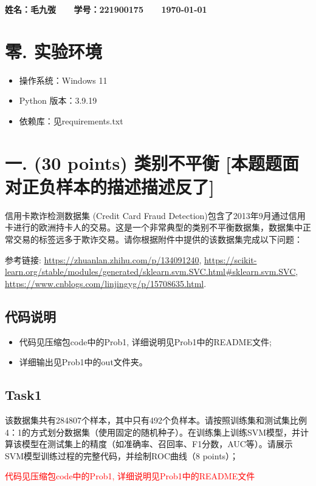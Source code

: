 \documentclass[8pt]{article}
\begin{document}
\textbf{\color{blue} \Large 姓名：毛九弢 \ \ \ 学号：221900175 \ \ \ \today}

\section*{零. 实验环境}
\begin{itemize}
    \item 操作系统：Windows 11
    \item Python 版本：3.9.19
    \item 依赖库：见requirements.txt
\end{itemize}

\section*{一. (30 points) 类别不平衡 [本题题面对正负样本的描述描述反了]}

信用卡欺诈检测数据集 (Credit Card Fraud Detection)包含了2013年9月通过信用卡进行的欧洲持卡人的交易。这是一个非常典型的类别不平衡数据集，数据集中正常交易的标签远多于欺诈交易。请你根据附件中提供的该数据集完成以下问题：

参考链接: 
\url{https://zhuanlan.zhihu.com/p/134091240},
\url{https://scikit-learn.org/stable/modules/generated/sklearn.svm.SVC.html#sklearn.svm.SVC},
\url{https://www.cnblogs.com/linjingyg/p/15708635.html}.

\subsection*{代码说明}
\begin{itemize}
    \item 代码见压缩包code中的Prob1, 详细说明见Prob1中的README文件; 
    \item 详细输出见Prob1中的out文件夹。
\end{itemize}

\subsection*{Task1}
该数据集共有284807个样本，其中只有492个负样本。请按照训练集和测试集比例4：1的方式划分数据集（使用固定的随机种子）。在训练集上训练SVM模型，并计算该模型在测试集上的精度（如准确率、召回率、F1分数，AUC等）。请展示SVM模型训练过程的完整代码，并绘制ROC曲线（8 points）；

\textcolor{red}{代码见压缩包code中的Prob1, 详细说明见Prob1中的README文件}
\end{document}
